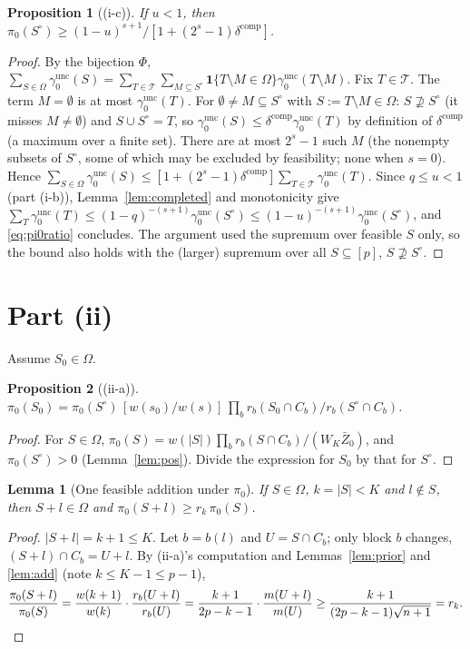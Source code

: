 \documentclass[11pt]{article}
\newtheorem{lemma}{Lemma}
\newtheorem{proposition}{Proposition}
\theoremstyle{remark}
\newcommand{\unc}{\mathrm{unc}}
\newcommand{\comp}{\mathrm{comp}}
\newcommand{\gu}{\gamma_0^{\unc}}
\begin{document}
\begin{proposition}[(i-c)]
If $u<1$, then $\pi_0(S^\circ)\ge(1-u)^{s+1}/[1+(2^s-1)\delta^{\comp}]$.
\end{proposition}

\begin{proof}
By the bijection $\Phi$, $\sum_{S\in\Omega}\gu(S)=\sum_{T\in\mathcal T}\sum_{M\subseteq S^\circ}\mathbf 1\{T\setminus M\in\Omega\}\gu(T\setminus M)$. Fix $T\in\mathcal T$. The term $M=\emptyset$ is at most $\gu(T)$. For $\emptyset\ne M\subseteq S^\circ$ with $S:=T\setminus M\in\Omega$: $S\not\supseteq S^\circ$ (it misses $M\neq\emptyset$) and $S\cup S^\circ=T$, so $\gu(S)\le\delta^{\comp}\gu(T)$ by definition of $\delta^{\comp}$ (a maximum over a finite set). There are at most $2^s-1$ such $M$ (the nonempty subsets of $S^\circ$, some of which may be excluded by feasibility; none when $s=0$). Hence $\sum_{S\in\Omega}\gu(S)\le[1+(2^s-1)\delta^{\comp}]\sum_{T\in\mathcal T}\gu(T)$. Since $q\le u<1$ (part (i-b)), Lemma~\ref{lem:completed} and monotonicity give $\sum_{T}\gu(T)\le(1-q)^{-(s+1)}\gu(S^\circ)\le(1-u)^{-(s+1)}\gu(S^\circ)$, and \eqref{eq:pi0ratio} concludes. The argument used the supremum over feasible $S$ only, so the bound also holds with the (larger) supremum over all $S\subseteq[p]$, $S\not\supseteq S^\circ$.
\end{proof}

\section{Part (ii)}

Assume $S_0\in\Omega$.

\begin{proposition}[(ii-a)]
$\pi_0(S_0)=\pi_0(S^\circ)\,[w(s_0)/w(s)]\,\prod_b r_b(S_0\cap C_b)/r_b(S^\circ\cap C_b)$.
\end{proposition}

\begin{proof}
For $S\in\Omega$, $\pi_0(S)=w(|S|)\prod_b r_b(S\cap C_b)/(W_K\bar Z_0)$, and $\pi_0(S^\circ)>0$ (Lemma~\ref{lem:pos}). Divide the expression for $S_0$ by that for $S^\circ$.
\end{proof}

\begin{lemma}[One feasible addition under $\pi_0$]\label{lem:pi0add}
If $S\in\Omega$, $k=|S|<K$ and $l\notin S$, then $S+l\in\Omega$ and $\pi_0(S+l)\ge r_k\,\pi_0(S)$.
\end{lemma}

\begin{proof}
$|S+l|=k+1\le K$. Let $b=b(l)$ and $U=S\cap C_b$; only block $b$ changes, $(S+l)\cap C_b=U+l$. By (ii-a)'s computation and Lemmas~\ref{lem:prior} and \ref{lem:add} (note $k\le K-1\le p-1$),
\[
\frac{\pi_0(S+l)}{\pi_0(S)}=\frac{w(k+1)}{w(k)}\cdot\frac{r_b(U+l)}{r_b(U)}=\frac{k+1}{2p-k-1}\cdot\frac{m(U+l)}{m(U)}\ge\frac{k+1}{(2p-k-1)\sqrt{n+1}}=r_k.\qedhere
\]
\end{proof}
\end{document}
